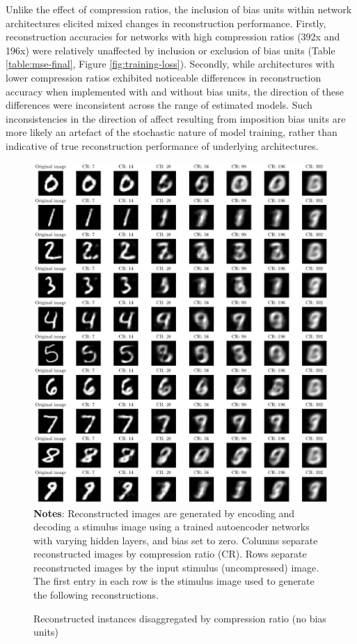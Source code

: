 Unlike the effect of compression ratios, the inclusion of bias units within network architectures elicited mixed changes in reconstruction performance.
Firstly, reconstruction accuracies for networks with high compression ratios (392x and 196x) were relatively unaffected by  inclusion or exclusion of bias units (Table \ref{table:mse-final}, Figure \ref{fig:training-loss}).
Secondly, while architectures with lower compression ratios exhibited noticeable differences in reconstruction accuracy when implemented with and without bias units, the direction of these differences were inconsistent across the range of estimated models.
Such inconsistencies in the direction of affect resulting from imposition bias units are more likely an artefact of the stochastic nature of model training, rather than indicative of true reconstruction performance of underlying architectures. 

\begin{figure}
    \caption{Reconstructed instances disaggregated by compression ratio (no bias units)}
	\label{fig:decoded-instances}
	\includegraphics[width=1.0\textwidth]{graphics/decoded_instances.pdf}
    \textbf{Notes}: Reconstructed images are generated by encoding and decoding a stimulus image using a trained autoencoder networks with varying hidden layers, and bias set to zero. Columns separate reconstructed images by compression ratio (CR). Rows separate reconstructed images by the input stimulus (uncompressed) image. The first entry in each row is the stimulus image used to generate the following reconstructions.
\end{figure}

